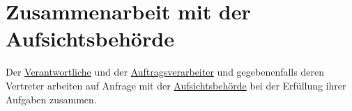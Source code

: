 \chapter{Zusammenarbeit mit der Aufsichtsbehörde}
\label{ch:31}


Der \hyperref[itm:04-7]{Verantwortliche} und der \hyperref[itm:04-8]{Auftragsverarbeiter} und gegebenenfalls deren Vertreter arbeiten auf Anfrage mit der
\hyperref[itm:04-21]{Aufsichtsbehörde} bei der Erfüllung ihrer Aufgaben zusammen.


